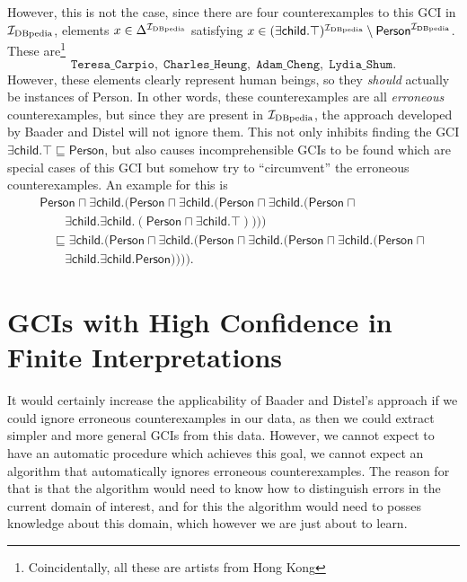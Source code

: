 However, this is not the case, since there are four counterexamples to this GCI in
${\mathcal{I}_{\text{DBpedia}}}$, \ie elements $x \in \Delta^{{\mathcal{I}_{\text{DBpedia}}}}$ satisfying $x \in (\mathsf{\exists
  child. \top})^{{\mathcal{I}_{\text{DBpedia}}}} \setminus \mathsf{Person}^{{\mathcal{I}_{\text{DBpedia}}}}$.  These
are\footnote{Coincidentally, all these are artists from Hong Kong}
\begin{equation*}
  \mathtt{Teresa\_Carpio},\; \mathtt{Charles\_Heung},\;
  \mathtt{Adam\_Cheng}, \; \mathtt{Lydia\_Shum}.
\end{equation*}
However, these elements clearly represent human beings, so they \emph{should} actually be
instances of \textsf{Person}.  In other words, these counterexamples are all
\emph{erroneous} counterexamples, but since they are present in ${\mathcal{I}_{\text{DBpedia}}}$, the approach
developed by Baader and Distel will not ignore them.  This not only inhibits finding the
GCI $\mathsf{\exists child. \top \sqsubseteq Person}$, but also causes incomprehensible
GCIs to be found which are special cases of this GCI but somehow try to ``circumvent'' the
erroneous counterexamples. An example for this is
\begin{gather*}
  \mathsf{Person \sqcap \exists child. (Person \sqcap \exists child. (Person \sqcap \exists child.
    (Person \sqcap {}}\\
  \quad \quad \mathsf{\exists child. \exists child. (Person \sqcap \exists child. \top))))}
  \\
  \mathsf{ \quad \sqsubseteq
    \exists child. (Person \sqcap \exists child. (Person \sqcap \exists child. (Person \sqcap
    \exists child. (Person \sqcap {}}\\
  \mathsf{\quad \quad \exists child. \exists child. Person))))}.
\end{gather*}

\section{GCIs with High Confidence in Finite Interpretations}
\label{sec:confident-gcis}

It would certainly increase the applicability of Baader and Distel's approach if we could
ignore erroneous counterexamples in our data, as then we could extract simpler and more
general GCIs from this data.  However, we cannot expect to have an automatic procedure
which achieves this goal, \ie we cannot expect an algorithm that automatically ignores
erroneous counterexamples.  The reason for that is that the algorithm would need to know
how to distinguish errors in the current domain of interest, and for this the algorithm
would need to posses knowledge about this domain, which however we are just about to
learn.

